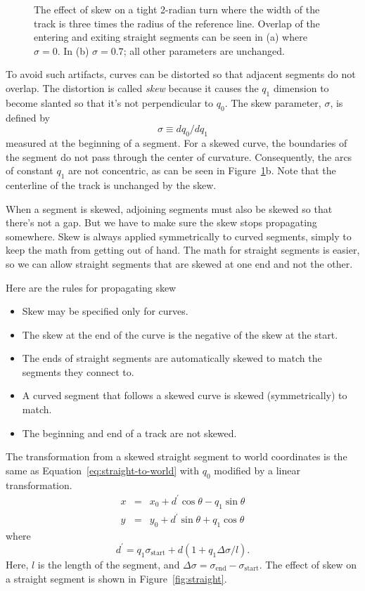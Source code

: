 \documentclass{article}
\newcommand{\skewstart}{%
  \ensuremath{\sigma_\mathrm{start}}}
\newcommand{\skewend}{%
  \ensuremath{\sigma_\mathrm{end}}}
\begin{document}
\begin{figure}
  \centering
  \caption{The effect of skew on a tight 2-radian turn where the width
    of the track is three times the radius of the reference line.
    Overlap of the entering and exiting straight segments can be seen
    in (a) where $\sigma = 0$.  In (b) $\sigma = 0.7$; all other
    parameters are unchanged.}
  \label{fig:overlap}
\end{figure}

To avoid such artifacts, curves can be distorted so that adjacent
segments do not overlap.  The distortion is called {\em skew} because
it causes the $q_1$ dimension to become slanted so that it's not
perpendicular to $q_0$.  The skew parameter, $\sigma$, is defined by
\begin{equation}
  \label{eq:skew-definition}
  \sigma \equiv dq_0/dq_1
\end{equation}
measured at the beginning of a segment.  For a skewed curve, the
boundaries of the segment do not pass through the center of curvature.
Consequently, the arcs of constant $q_1$ are not concentric, as can be
seen in Figure~\ref{fig:overlap}b.  Note that the centerline of the
track is unchanged by the skew.

When a segment is skewed, adjoining segments must also be skewed so
that there's not a gap.  But we have to make sure the skew stops
propagating somewhere.  Skew is always applied symmetrically to curved
segments, simply to keep the math from getting out of hand.  The math
for straight segments is easier, so we can allow straight segments
that are skewed at one end and not the other.

Here are the rules for propagating skew
\begin{itemize}
\item Skew may be specified only for curves.
\item The skew at the end of the curve is the negative of the skew at
  the start.
\item The ends of straight segments are automatically skewed to match
  the segments they connect to.
\item A curved segment that follows a skewed curve is skewed
  (symmetrically) to match.
\item The beginning and end of a track are not skewed.
\end{itemize}

The transformation from a skewed straight segment to world coordinates
is the same as Equation~\ref{eq:straight-to-world} with $q_0$ modified
by a linear transformation.
\begin{eqnarray}
  \label{eq:skewed-straight-to-world}
  x & = & x_0 + d^\prime \cos \theta - q_1 \sin \theta \\
  y & = & y_0 + d^\prime \sin \theta + q_1 \cos \theta \nonumber
\end{eqnarray}
where 
\begin{equation}
 \label{eq:d-prime}
  d^\prime =  q_1 \skewstart + d(1 + q_1\Delta\sigma/l).
\end{equation}
Here, $l$ is the length of the segment, and $\Delta\sigma = \skewend -
\skewstart$.  The effect of skew on a
straight segment is shown in Figure~\ref{fig:straight}.
\end{document}
